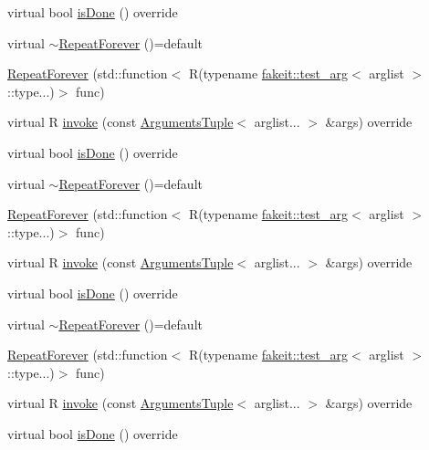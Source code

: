 \begin{DoxyCompactItemize}
\item 
virtual bool \mbox{\hyperlink{structfakeit_1_1RepeatForever_af5922669a521e99ca18218972b86cb87}{is\+Done}} () override
\item 
virtual \mbox{\hyperlink{structfakeit_1_1RepeatForever_ae4c256607ab407cea8403d49538cb320}{$\sim$\+Repeat\+Forever}} ()=default
\item 
\mbox{\hyperlink{structfakeit_1_1RepeatForever_a4f3eb9d8eda23dcc882ab5363466a379}{Repeat\+Forever}} (std\+::function$<$ R(typename \mbox{\hyperlink{structfakeit_1_1test__arg}{fakeit\+::test\+\_\+arg}}$<$ arglist $>$\+::type...)$>$ func)
\item 
virtual R \mbox{\hyperlink{structfakeit_1_1RepeatForever_a9fcab18dc26a1f74a22e82a775f06ea6}{invoke}} (const \mbox{\hyperlink{namespacefakeit_a476a37a598825e1b5dd67b3a176491a1}{Arguments\+Tuple}}$<$ arglist... $>$ \&args) override
\item 
virtual bool \mbox{\hyperlink{structfakeit_1_1RepeatForever_af5922669a521e99ca18218972b86cb87}{is\+Done}} () override
\item 
virtual \mbox{\hyperlink{structfakeit_1_1RepeatForever_ae4c256607ab407cea8403d49538cb320}{$\sim$\+Repeat\+Forever}} ()=default
\item 
\mbox{\hyperlink{structfakeit_1_1RepeatForever_a4f3eb9d8eda23dcc882ab5363466a379}{Repeat\+Forever}} (std\+::function$<$ R(typename \mbox{\hyperlink{structfakeit_1_1test__arg}{fakeit\+::test\+\_\+arg}}$<$ arglist $>$\+::type...)$>$ func)
\item 
virtual R \mbox{\hyperlink{structfakeit_1_1RepeatForever_a9fcab18dc26a1f74a22e82a775f06ea6}{invoke}} (const \mbox{\hyperlink{namespacefakeit_a476a37a598825e1b5dd67b3a176491a1}{Arguments\+Tuple}}$<$ arglist... $>$ \&args) override
\item 
virtual bool \mbox{\hyperlink{structfakeit_1_1RepeatForever_af5922669a521e99ca18218972b86cb87}{is\+Done}} () override
\item 
virtual \mbox{\hyperlink{structfakeit_1_1RepeatForever_ae4c256607ab407cea8403d49538cb320}{$\sim$\+Repeat\+Forever}} ()=default
\item 
\mbox{\hyperlink{structfakeit_1_1RepeatForever_a4f3eb9d8eda23dcc882ab5363466a379}{Repeat\+Forever}} (std\+::function$<$ R(typename \mbox{\hyperlink{structfakeit_1_1test__arg}{fakeit\+::test\+\_\+arg}}$<$ arglist $>$\+::type...)$>$ func)
\item 
virtual R \mbox{\hyperlink{structfakeit_1_1RepeatForever_a9fcab18dc26a1f74a22e82a775f06ea6}{invoke}} (const \mbox{\hyperlink{namespacefakeit_a476a37a598825e1b5dd67b3a176491a1}{Arguments\+Tuple}}$<$ arglist... $>$ \&args) override
\item 
virtual bool \mbox{\hyperlink{structfakeit_1_1RepeatForever_af5922669a521e99ca18218972b86cb87}{is\+Done}} () override
\end{DoxyCompactItemize}


